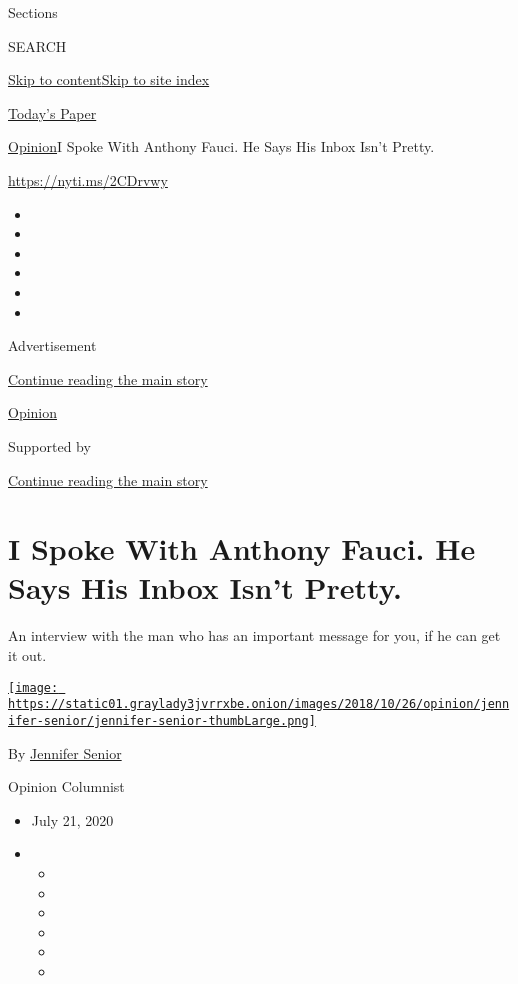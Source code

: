 Sections

SEARCH

\protect\hyperlink{site-content}{Skip to
content}\protect\hyperlink{site-index}{Skip to site index}

\href{https://myaccount.nytimes3xbfgragh.onion/auth/login?response_type=cookie\&client_id=vi}{}

\href{https://www.nytimes3xbfgragh.onion/section/todayspaper}{Today's
Paper}

\href{/section/opinion}{Opinion}\textbar{}I Spoke With Anthony Fauci. He
Says His Inbox Isn't Pretty.

\url{https://nyti.ms/2CDrvwy}

\begin{itemize}
\item
\item
\item
\item
\item
\item
\end{itemize}

Advertisement

\protect\hyperlink{after-top}{Continue reading the main story}

\href{/section/opinion}{Opinion}

Supported by

\protect\hyperlink{after-sponsor}{Continue reading the main story}

\hypertarget{i-spoke-with-anthony-fauci-he-says-his-inbox-isnt-pretty}{%
\section{I Spoke With Anthony Fauci. He Says His Inbox Isn't
Pretty.}\label{i-spoke-with-anthony-fauci-he-says-his-inbox-isnt-pretty}}

An interview with the man who has an important message for you, if he
can get it out.

\href{https://www.nytimes3xbfgragh.onion/by/jennifer-senior}{\texttt{[image: https://static01.graylady3jvrrxbe.onion/images/2018/10/26/opinion/jennifer-senior/jennifer-senior-thumbLarge.png]}}

By \href{https://www.nytimes3xbfgragh.onion/by/jennifer-senior}{Jennifer
Senior}

Opinion Columnist

\begin{itemize}
\item
  July 21, 2020
\item
  \begin{itemize}
  \item
  \item
  \item
  \item
  \item
  \item
  \end{itemize}
\end{itemize}

